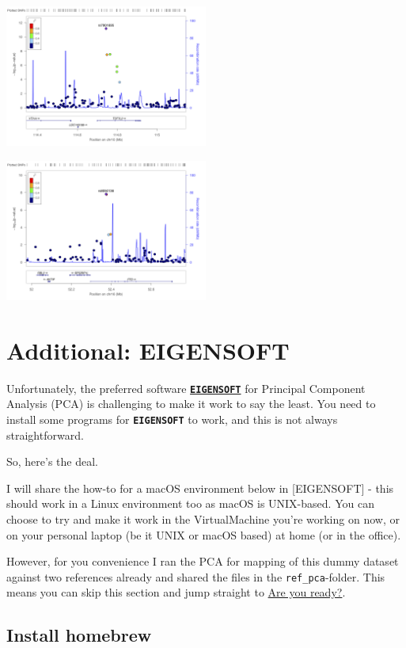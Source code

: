 \documentclass[
]{book}
\begin{document}
\includegraphics[width=0.5\textwidth,height=\textheight]{./img/_gwas/CEU.rs7901695.400kb.png}

\includegraphics[width=0.5\textwidth,height=\textheight]{./img/_gwas/CEU.rs8050136.400kb.png}

\hypertarget{eigensoft}{%
\chapter{Additional: EIGENSOFT}\label{eigensoft}}

Unfortunately, the preferred software \textbf{\href{https://github.com/DReichLab/EIG}{\texttt{EIGENSOFT}}} for Principal Component Analysis (PCA) is challenging to make it work to say the least. You need to install some programs for \textbf{\texttt{EIGENSOFT}} to work, and this is not always straightforward.

So, here's the deal.

I will share the how-to for a macOS environment below in {[}EIGENSOFT{]} - this should work in a Linux environment too as macOS is UNIX-based. You can choose to try and make it work in the VirtualMachine you're working on now, or on your personal laptop (be it UNIX or macOS based) at home (or in the office).

However, for you convenience I ran the PCA for mapping of this dummy dataset against two references already and shared the files in the \texttt{ref\_pca}-folder. This means you can skip this section and jump straight to \protect\hyperlink{are-you-ready}{Are you ready?}.

\hypertarget{install-homebrew}{%
\section{Install homebrew}\label{install-homebrew}}
\end{document}
